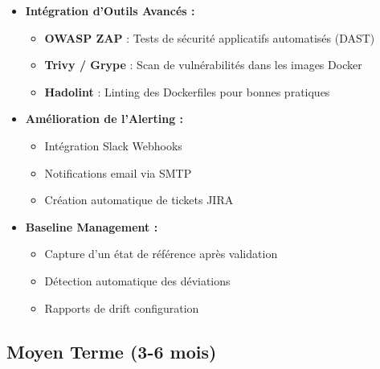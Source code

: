 \documentclass[11pt,a4paper]{report}
\begin{document}
\begin{itemize}
    \item \textbf{Intégration d'Outils Avancés :}
    \begin{itemize}
        \item \textbf{OWASP ZAP} : Tests de sécurité applicatifs automatisés (DAST)
        \item \textbf{Trivy / Grype} : Scan de vulnérabilités dans les images Docker
        \item \textbf{Hadolint} : Linting des Dockerfiles pour bonnes pratiques
    \end{itemize}
    
    \item \textbf{Amélioration de l'Alerting :}
    \begin{itemize}
        \item Intégration Slack Webhooks
        \item Notifications email via SMTP
        \item Création automatique de tickets JIRA
    \end{itemize}
    
    \item \textbf{Baseline Management :}
    \begin{itemize}
        \item Capture d'un état de référence après validation
        \item Détection automatique des déviations
        \item Rapports de drift configuration
    \end{itemize}
\end{itemize}

\subsection{Moyen Terme (3-6 mois)}
\end{document}
